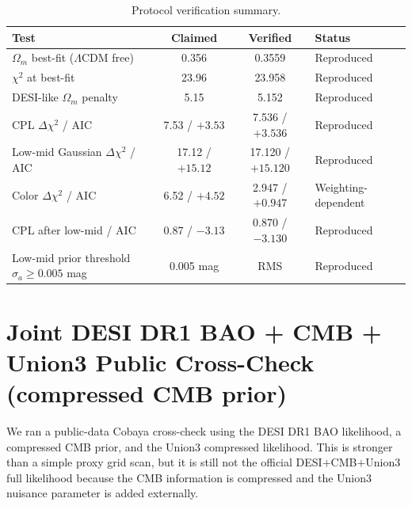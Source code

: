 \documentclass[11pt]{article}
\begin{document}
\begin{table}[h]
\centering
\caption{Protocol verification summary.}
\label{tab:protocol}
\small\setlength{\tabcolsep}{4pt}
\begin{tabular}{lccl}
\toprule
Test & Claimed & Verified & Status \\
\midrule
$\Omega_m$ best-fit ($\Lambda$CDM free) & 0.356 & 0.3559 & Reproduced \\
$\chi^2$ at best-fit & 23.96 & 23.958 & Reproduced \\
DESI-like $\Omega_m$ penalty & 5.15 & 5.152 & Reproduced \\
CPL $\Delta\chi^2$ / AIC & 7.53 / $+3.53$ & 7.536 / $+3.536$ & Reproduced \\
Low-mid Gaussian $\Delta\chi^2$ / AIC & 17.12 / $+15.12$ & 17.120 / $+15.120$ & Reproduced \\
Color $\Delta\chi^2$ / AIC & 6.52 / $+4.52$ & 2.947 / $+0.947$ & Weighting-dependent \\
CPL after low-mid / AIC & 0.87 / $-3.13$ & 0.870 / $-3.130$ & Reproduced \\
Low-mid prior threshold $\sigma_a\ge0.005$ mag & 0.005 mag & RMS & Reproduced \\
\bottomrule
\end{tabular}
\end{table}

\section{Joint DESI DR1 BAO + CMB + Union3 Public Cross-Check (compressed CMB prior)}

We ran a public-data Cobaya cross-check using the DESI DR1 BAO likelihood, a compressed
CMB prior, and the Union3 compressed likelihood. This is stronger than a simple proxy
grid scan, but it is still not the official DESI$+$CMB$+$Union3 full likelihood because
the CMB information is compressed and the Union3 nuisance parameter is added externally.
\end{document}
